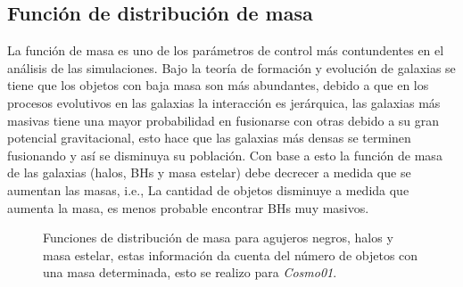     \subsection{ Función de distribución de masa}
    \label{subsec: funcion de masa}
La función de masa es uno de los parámetros de control más contundentes en el análisis de las simulaciones. Bajo la teoría de formación y evolución de galaxias se tiene que los objetos con baja masa son más abundantes, debido a que en los procesos evolutivos en las galaxias la interacción es jerárquica, las galaxias más masivas tiene una mayor probabilidad en fusionarse con otras debido a su gran potencial gravitacional, esto hace que las galaxias más densas se terminen fusionando y así se disminuya su población. Con base a esto la función de masa de las galaxias (halos, BHs y masa estelar) debe decrecer a medida que se aumentan las masas, i.e., La cantidad de objetos disminuye a medida que aumenta la masa, es menos probable encontrar BHs muy masivos.
%
\begin{figure}
\centering
{}
\caption{Funciones de distribución de masa para agujeros negros, halos y masa estelar, estas información da cuenta del número de objetos con una masa determinada, esto se realizo para {\it{Cosmo01}}. }
 \label{fig: Funciones de masa cosmo01}
\end{figure}
